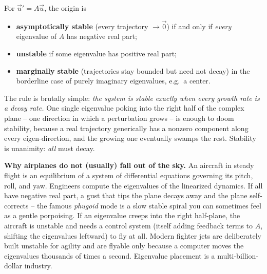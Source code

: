 \begin{theorem}
\label{ch39:thm-stability}
For $\vec u' = A\vec u$, the origin is
\begin{itemize}
\item \textbf{asymptotically stable} (every trajectory $\to \vec 0$) if and only
if \emph{every} eigenvalue of $A$ has negative real part;
\item \textbf{unstable} if some eigenvalue has positive real part;
\item \textbf{marginally stable} (trajectories stay bounded but need not decay)
in the borderline case of purely imaginary eigenvalues, e.g.\ a center.
\end{itemize}
\end{theorem}

\begin{intuitionbox}
The rule is brutally simple: \emph{the system is stable exactly when every growth
rate is a decay rate.} One single eigenvalue poking into the right half of the
complex plane -- one direction in which a perturbation grows -- is enough to
doom stability, because a real trajectory generically has a nonzero component
along every eigen-direction, and the growing one eventually swamps the rest.
Stability is unanimity: \emph{all} must decay.
\end{intuitionbox}

\begin{applicationbox}
\textbf{Why airplanes do not (usually) fall out of the sky.} An aircraft in
steady flight is an equilibrium of a system of differential equations governing
its pitch, roll, and yaw. Engineers compute the eigenvalues of the linearized
dynamics. If all have negative real part, a gust that tips the plane decays away
and the plane self-corrects -- the famous \emph{phugoid} mode is a slow stable
spiral you can sometimes feel as a gentle porpoising. If an eigenvalue creeps
into the right half-plane, the aircraft is unstable and needs a control system
(itself adding feedback terms to $A$, shifting the eigenvalues leftward) to fly
at all. Modern fighter jets are deliberately built unstable for agility and are
flyable only because a computer moves the eigenvalues thousands of times a
second. Eigenvalue placement is a multi-billion-dollar industry.
\end{applicationbox}

